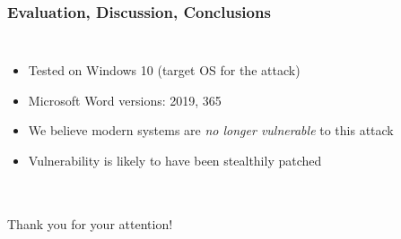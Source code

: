 \documentclass[fleqn]{beamer}
\begin{document}
\begin{frame}
  \frametitle{Evaluation, Discussion, Conclusions}
  \begin{columns}[T]
    \column{\textwidth}
    \begin{itemize}
      \item Tested on Windows 10 (target OS for the attack) 
      \item Microsoft Word versions: 2019, 365
      \item We believe modern systems are \emph{no longer vulnerable} to this attack
      \item Vulnerability is likely to have been stealthily patched
    \end{itemize}
  \end{columns}
\end{frame}

\begin{frame}
  \frametitle{}
  Thank you for your attention!
\end{frame}
\end{document}
